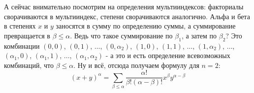 \documentclass[book, 11pt]{report}
\begin{document}
{\begin{equation*}
        \end{equation*}
        А сейчас внимательно посмотрим на определения мультииндексов: факториалы сворачиваются в мультииндекс, степени сворачиваются аналогично. Альфа и бета в степенях $x$ и $y$ заносятся в сумму по определению суммы, а суммирование превращается в $\beta\leq\alpha$. Ведь что такое суммирование по $\beta_1$, а затем по $\beta_2$? Это комбинации $(0,0)$, $(0,1)$, $\ldots$, $(0,\alpha_2)$, $(1,0)$, $(1,1)$, $\ldots$, $(1,\alpha_2)$, $\ldots$, $(\alpha_1,0)$, $(\alpha_1,1)$, $\ldots$, $(\alpha_1,\alpha_2)$ - а это и есть определение всевозможных комбинаций, что $\beta\leq\alpha$. Ну и всё, отсюда получаем формулу для $n=2$:
        \begin{equation*}
             \displaystyle(x+y)^{\alpha}=\sum_{\beta\leq\alpha}\frac{\alpha!}{\beta!(\alpha-\beta)!}x^{\beta}y^{\alpha-\beta}
        \end{equation*}
        }
        \vspace{0.4cm}
\end{document}
